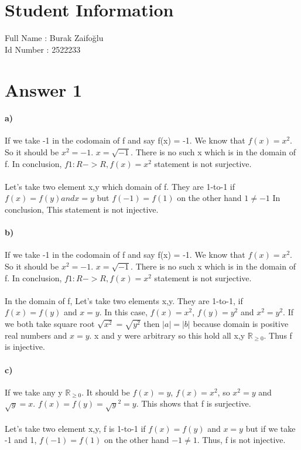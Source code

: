 \documentclass[12pt]{article}
\begin{document}
\section*{Student Information } 
Full Name :  Burak Zaifoğlu\\
Id Number :  2522233\\

\section*{Answer 1}
\paragraph{a)} If we take -1 in the codomain of f and say f(x) = -1. \hspace We know that $f(x) = x^2$. \hspace So it should be $x^2 = -1$. \hspace $x = \sqrt{-1}$. There is no such x which is in the domain of f. In conclusion, $f1 : R -> R, f(x) = x^2$ statement is not surjective. \\
\\
Let's take two element x,y which domain of f. They are 1-to-1 if $f(x) = f(y) and x = y$ but $f(-1) = f(1)$ on the other hand $1 \not= -1$ In conclusion, This statement is not injective. %
\paragraph{b)} If we take -1 in the codomain of f and say f(x) = -1. \hspace We know that $f(x) = x^2$. \hspace So it should be $x^2 = -1$. \hspace $x = \sqrt{-1}$. There is no such x which is in the domain of f. In conclusion, $f1 : R -> R, f(x) = x^2$ statement is not surjective.\\
\\
In the domain of f, Let's take two elements x,y. They are 1-to-1, if $f(x) = f(y)$ and $x = y$. \hspace  In this case, $f(x) = x^2$, $f(y) = y^2$ and $x^2 = y^2$. If we both take square root $\sqrt{x^2} = \sqrt{y^2}$ then $|a| = |b|$ because domain is positive real numbers and $x=y$. x and y were arbitrary so this hold all \forall x,y \in $\mathbb R_{\ge 0}$. Thus f is injective. %
\paragraph{c)} If we take any y \in $\mathbb R_{\ge 0}$. It should be $f(x) = y$, $f(x) = x^2$, so $x^2 = y$ and $\sqrt{y} = x$. $f(x) = f(y)= \sqrt{y}^2 = y$. This shows that f is surjective.\\
\\
Let's take two element x,y, f is 1-to-1 if $f(x) = f(y)$ and $x=y$ but if we take -1 and 1, $f(-1) = f(1)$ on the other hand $-1 \not= 1$. Thus, f is not injective.
\end{document}
